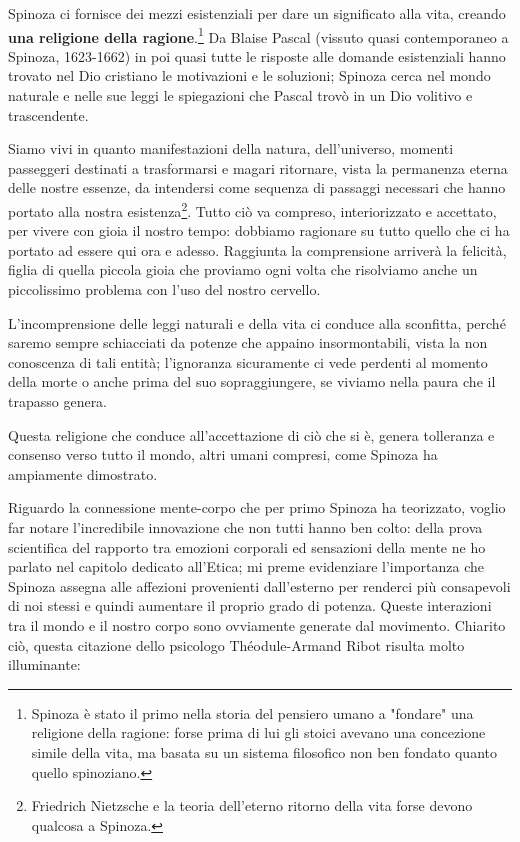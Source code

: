 Spinoza ci fornisce dei mezzi esistenziali per dare un significato alla vita, creando \textbf{una religione della ragione}.\footnote{Spinoza è stato il primo nella storia del pensiero umano a "fondare" una religione della ragione: forse prima di lui gli stoici avevano una concezione simile della vita, ma basata su un sistema filosofico non ben fondato quanto quello spinoziano.} Da Blaise Pascal (vissuto quasi contemporaneo a Spinoza, 1623-1662) in poi quasi tutte le risposte alle domande esistenziali hanno trovato nel Dio cristiano le motivazioni e le soluzioni; Spinoza cerca nel mondo naturale e nelle sue leggi le spiegazioni che Pascal trovò in un Dio volitivo e trascendente.

Siamo vivi in quanto manifestazioni della natura, dell'universo, momenti passeggeri destinati a trasformarsi e magari ritornare, vista la permanenza eterna delle nostre essenze, da intendersi come sequenza di passaggi necessari che hanno portato alla nostra esistenza\footnote{Friedrich Nietzsche e la teoria dell'eterno ritorno della vita forse devono qualcosa a Spinoza.}. Tutto ciò va compreso, interiorizzato e accettato, per vivere con gioia il nostro tempo: dobbiamo ragionare su tutto quello che ci ha portato ad essere qui ora e adesso. Raggiunta la comprensione arriverà la felicità, figlia di quella piccola gioia che proviamo ogni volta che risolviamo anche un piccolissimo problema con l'uso del nostro cervello.

L'incomprensione delle leggi naturali e della vita ci conduce alla sconfitta, perché saremo sempre schiacciati da potenze che appaino insormontabili, vista la non conoscenza di tali entità; l'ignoranza sicuramente ci vede perdenti al momento della morte o anche prima del suo sopraggiungere, se viviamo nella paura che il trapasso genera. 

Questa religione che conduce  all'accettazione di ciò che si è, genera tolleranza e consenso verso tutto il mondo, altri umani compresi, come Spinoza ha ampiamente dimostrato.

Riguardo la connessione mente-corpo che per primo Spinoza ha teorizzato, voglio far notare l'incredibile innovazione che non tutti hanno ben colto: della prova scientifica del rapporto tra emozioni corporali ed sensazioni della mente ne ho parlato nel capitolo dedicato all'Etica; mi preme evidenziare l'importanza che Spinoza assegna alle affezioni provenienti dall'esterno per renderci più consapevoli di noi stessi e quindi aumentare il proprio grado di potenza. Queste interazioni tra il mondo e il nostro corpo sono ovviamente generate dal movimento. Chiarito ciò, questa citazione dello psicologo Théodule-Armand Ribot risulta molto illuminante: 


